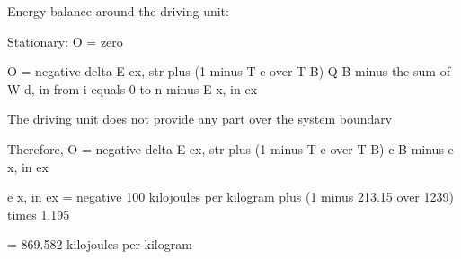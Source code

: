 Energy balance around the driving unit:

Stationary: O = zero

O = negative delta E ex, str plus (1 minus T e over T B) Q B minus the sum of W d, in from i equals 0 to n minus E x, in ex

The driving unit does not provide any part over the system boundary

Therefore, O = negative delta E ex, str plus (1 minus T e over T B) c B minus e x, in ex

e x, in ex = negative 100 kilojoules per kilogram plus (1 minus 213.15 over 1239) times 1.195

= 869.582 kilojoules per kilogram